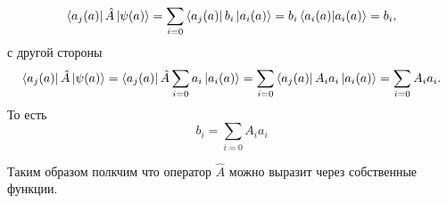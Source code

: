 \begin{equation*} 
    \bra{a_j(a)} \hat A \ket{\psi(a)} = 
    \sum_{i = 0} \bra{a_j(a)} b_i \ket{a_i(a)} = 
    b_i \bra{a_i(a)} \ket{a_i(a)} = b_i,
\end{equation*} 
с другой стороны 
\begin{equation*} 
    \bra{a_j(a)} \hat A \ket{\psi(a)} = 
    \bra{a_j(a)} \hat A \sum_{i = 0} a_i \ket{a_i(a)} = 
    \sum_{i = 0} \bra{a_j(a)} A_i a_i \ket{a_i(a)} = 
    \sum_{i = 0} A_i a_i.
\end{equation*} 
То есть 
\begin{equation} 
 b_i = \sum_{i = 0} A_i a_i
\end{equation} 

Таким образом полкчим что оператор $\hat A$ можно 
выразит через собственные функции.